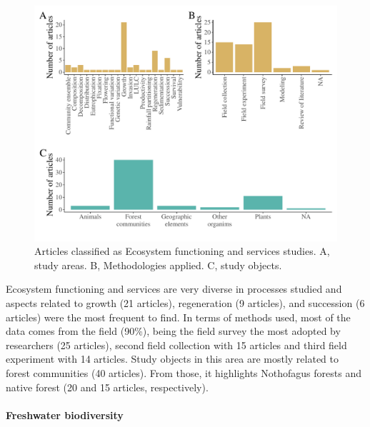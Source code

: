 \documentclass[]{article}
\let\oldparagraph\paragraph
\renewcommand{\paragraph}[1]{\oldparagraph{#1}\mbox{}}
\begin{document}
\begin{figure}
\centering
\includegraphics{Review_and_climate_files/figure-latex/Ecosys-1.pdf}
\caption{\label{fig:Ecosys}Articles classified as Ecosystem functioning and services studies. A, study areas. B, Methodologies applied. C, study objects.}
\end{figure}

Ecosystem functioning and services are very diverse in processes studied and aspects related to growth (21 articles), regeneration (9 articles), and succession (6 articles) were the most frequent to find. In terms of methods used, most of the data comes from the field (90\%), being the field survey the most adopted by researchers (25 articles), second field collection with 15 articles and third field experiment with 14 articles.
Study objects in this area are mostly related to forest communities (40 articles). From those, it highlights Nothofagus forests and native forest (20 and 15 articles, respectively).

\hypertarget{freshwater-biodiversity}{%
\paragraph{Freshwater biodiversity}\label{freshwater-biodiversity}}
\end{document}
